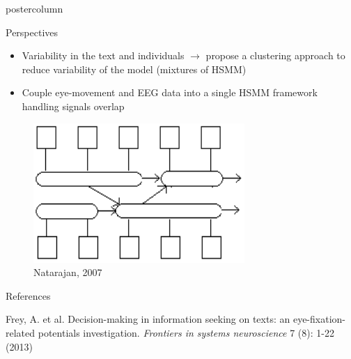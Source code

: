 \documentclass[final,hyperref={pdfpagelabels=false}]{beamer}
\begin{document}
\begin{frame}
\begin{columns}
\begin{column}{.50\textwidth}
\begin{beamercolorbox}[center,wd=\textwidth]{postercolumn}
\begin{minipage}[T]{.98\textwidth}
{            %

            \vfill
            \begin{block}{Perspectives}
                \vskip0.2cm
                \begin{minipage}{0.67\textwidth}
                    \begin{itemize}
                        \item[\bullet] Variability in the text and individuals $\rightarrow$ propose a clustering approach to reduce variability of the model (mixtures of HSMM)
                        \item[\bullet] Couple eye-movement and EEG data into a single HSMM framework handling signals overlap
                    \end{itemize}
                \end{minipage}
                \begin{minipage}{0.30\textwidth}
                    \begin{figure}[h]
                        \centering
                        \includegraphics[heigth=10cm]{chsmm_representation.png}
                        \caption{Natarajan, 2007}
                    \end{figure}
                \end{minipage}


            \end{block}

            \vfill
            \begin{block}{References}
                \begin{enumerate}
                    {\footnotesize
                    \item Frey, A. et al.
                    Decision-making in information seeking on texts: an eye-fixation-related potentials investigation.
                    \textit{Frontiers in systems neuroscience} 7 (8): 1-22 (2013)

}
\end{enumerate}
\end{block}}
\end{minipage}
\end{beamercolorbox}
\end{column}
\end{columns}
\end{frame}
\end{document}
